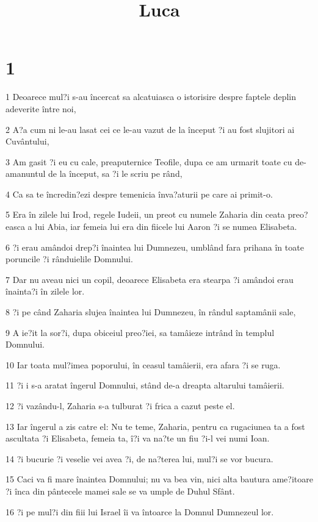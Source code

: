 

\title{Luca}


\chapter{1}

\par 1 Deoarece mul?i s-au încercat sa alcatuiasca o istorisire despre faptele deplin adeverite între noi,
\par 2 A?a cum ni le-au lasat cei ce le-au vazut de la început ?i au fost slujitori ai Cuvântului,
\par 3 Am gasit ?i eu cu cale, preaputernice Teofile, dupa ce am urmarit toate cu de-amanuntul de la început, sa ?i le scriu pe rând,
\par 4 Ca sa te încredin?ezi despre temenicia înva?aturii pe care ai primit-o.
\par 5 Era în zilele lui Irod, regele Iudeii, un preot cu numele Zaharia din ceata preo?easca a lui Abia, iar femeia lui era din fiicele lui Aaron ?i se numea Elisabeta.
\par 6 ?i erau amândoi drep?i înaintea lui Dumnezeu, umblând fara prihana în toate poruncile ?i rânduielile Domnului.
\par 7 Dar nu aveau nici un copil, deoarece Elisabeta era stearpa ?i amândoi erau înainta?i în zilele lor.
\par 8 ?i pe când Zaharia slujea înaintea lui Dumnezeu, în rândul saptamânii sale,
\par 9 A ie?it la sor?i, dupa obiceiul preo?iei, sa tamâieze intrând în templul Domnului.
\par 10 Iar toata mul?imea poporului, în ceasul tamâierii, era afara ?i se ruga.
\par 11 ?i i s-a aratat îngerul Domnului, stând de-a dreapta altarului tamâierii.
\par 12 ?i vazându-l, Zaharia s-a tulburat ?i frica a cazut peste el.
\par 13 Iar îngerul a zis catre el: Nu te teme, Zaharia, pentru ca rugaciunea ta a fost ascultata ?i Elisabeta, femeia ta, î?i va na?te un fiu ?i-l vei numi Ioan.
\par 14 ?i bucurie ?i veselie vei avea ?i, de na?terea lui, mul?i se vor bucura.
\par 15 Caci va fi mare înaintea Domnului; nu va bea vin, nici alta bautura ame?itoare ?i înca din pântecele mamei sale se va umple de Duhul Sfânt.
\par 16 ?i pe mul?i din fiii lui Israel îi va întoarce la Domnul Dumnezeul lor.

